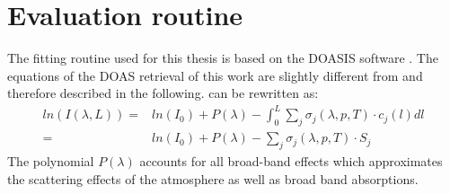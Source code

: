 \documentclass  [
  paper    = a4,
  BCOR     = 10mm,
  twoside,
  fontsize = 12pt,
  fleqn,
  toc      = bibnumbered,
  toc      = listofnumbered,
  numbers  = noendperiod,
  headings = normal,
  listof   = leveldown,
  version  = 3.03
]                                       {scrreprt}
\begin{document}
	\section{Evaluation routine}
	The fitting routine used for this thesis is based on the DOASIS software \citep{kraus2006doasis}. 
	The equations of the DOAS retrieval of this work are slightly different from  and therefore described in the following.
	 can be rewritten as:
	\begin{align}
	ln\left(I\left(\lambda, L\right)\right) = &ln\left(I_0 \right) + P \left(\lambda\right) -	\int_{0}^{L}\sum_{j}\sigma_j \left(\lambda, p, T \right) \cdot c_j \left(l\right)dl \nonumber \\
	= &ln\left(I_0 \right) + P \left(\lambda\right)-
	\sum_{j}\sigma_j \left(\lambda, p, T \right) \cdot S_j
	\label{eq:lben}
	\end{align}
	The polynomial $ P \left(\lambda\right)$ accounts for all broad-band effects which approximates the scattering effects of the atmosphere as well as broad band absorptions.
	
\end{document}
